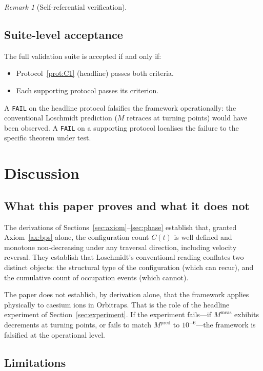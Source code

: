 \documentclass[twocolumn,10pt,a4paper]{article}
\theoremstyle{thmstyle}
\theoremstyle{definition}
\theoremstyle{remark}
\newtheorem{remark}[theorem]{Remark}
\begin{document}
\begin{remark}[Self-referential verification]
\subsection{Suite-level acceptance}

The full validation suite is accepted if and only if:
\begin{itemize}[nosep,leftmargin=*]
\item Protocol~\ref{prot:C1} (headline) passes both criteria.
\item Each supporting protocol passes its criterion.
\end{itemize}

A \texttt{FAIL} on the headline protocol falsifies the framework
operationally: the conventional Loschmidt prediction
($M$ retraces at turning points) would have been observed. A
\texttt{FAIL} on a supporting protocol localises the failure to the
specific theorem under test.

\section{Discussion}
\label{sec:discussion}

\subsection{What this paper proves and what it does not}

The derivations of Sections~\ref{sec:axiom}--\ref{sec:phase} establish
that, granted Axiom~\ref{ax:bps} alone, the configuration count
$C(t)$ is well defined and monotone non-decreasing under any
traversal direction, including velocity reversal. They establish that
Loschmidt's conventional reading conflates two distinct objects:
the structural type of the configuration (which can recur), and the
cumulative count of occupation events (which cannot).

The paper does not establish, by derivation alone, that the framework
applies physically to caesium ions in Orbitraps. That is the role of
the headline experiment of Section~\ref{sec:experiment}. If the
experiment fails---if $M^{\mathrm{meas}}$ exhibits decrements at
turning points, or fails to match $M^{\mathrm{pred}}$ to $10^{-6}$---the
framework is falsified at the operational level.

\subsection{Limitations}


\end{remark}
\end{document}

